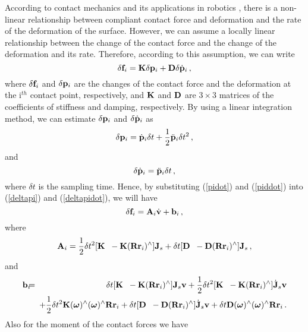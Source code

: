 \documentclass[a4paper, 11pt]{article}
\begin{document}
According to contact mechanics \cite{Johnson77} and its applications in
robotics \cite{Azad&Featherstone10, Azad&Featherstone14a, Hunt&Crossley75,
  Marhefka&Orin99}, there is a non-linear relationship between compliant
contact force and deformation and the rate of the deformation of the surface.
However, we can assume a locally linear relationship between the change of the
contact force and the change of the deformation and its rate.  Therefore,
according to this assumption, we can write
%
\begin{equation}
  \delta \mathbf{f}_i = \mathbf{K} \delta \mathbf{p}_i + \mathbf{D} \delta \dot{\mathbf{p}}_i \, ,
\end{equation}
%
where $\delta \mathbf{f}_i$ and $\delta \mathbf{p}_i$ are the changes of the contact force
and the deformation at the i$^{th}$ contact point, respectively, and $\mathbf{K}$ and
$\mathbf{D}$ are $3 \times 3$ matrices of the coefficients of stiffness and damping,
respectively.  By using a linear integration method, we can estimate $\delta
\mathbf{p}_i$ and $\delta \dot{\mathbf{p}}_i$ as
%
\begin{equation}
  \delta \mathbf{p}_i = \dot{\mathbf{p}}_i \delta t + \frac{1}{2} \ddot{\mathbf{p}}_i \delta t^2 \,
  ,
  \label{deltapi}
\end{equation}
%
and
%
\begin{equation}
  \delta \dot{\mathbf{p}}_i = \ddot{\mathbf{p}}_i \delta t \, ,
  \label{deltapidot}
\end{equation}
%
where $\delta t$ is the sampling time.  Hence, by substituting (\ref{pidot})
and (\ref{piddot}) into (\ref{deltapi}) and (\ref{deltapidot}), we will have
%
\begin{equation}
  \delta \mathbf{f}_i = \mathbf{A}_i \dot{\mathbf{v}} + \mathbf{b}_i \, ,
\end{equation}
%
where
%
%
\begin{equation}
  \mathbf{A}_i = \frac{1}{2} \delta t^2 [\mathbf{K} \; \; -\mathbf{K}(\mathbf{R} \mathbf{r}_i)^{\wedge}] \mathbf{J}_s +
  \delta t [\mathbf{D} \; \; - \mathbf{D}(\mathbf{R} \mathbf{r}_i)^{\wedge}] \mathbf{J}_s \, ,
\end{equation}
%
and
%
\begin{eqnarray}
  \nonumber \mathbf{b}_i & \!\!\!=\!\!\! & \delta t [\mathbf{K} \; \; -\mathbf{K}(\mathbf{R} \mathbf{r}_i)^{\wedge}] \mathbf{J}_s
  \mathbf{v} + \frac{1}{2} \delta t^2 [\mathbf{K} \; \; -\mathbf{K}(\mathbf{R} \mathbf{r}_i)^{\wedge}]
  \dot{\mathbf{J}}_s \mathbf{v}\\ & & + \frac{1}{2} \delta t^2 \mathbf{K} (\boldsymbol{\omega})^{\wedge}
  (\boldsymbol{\omega})^{\wedge} \mathbf{R} \mathbf{r}_i + \delta t [\mathbf{D} \; \; -\mathbf{D}(\mathbf{R} \mathbf{r}_i)^{\wedge}]
  \dot{\mathbf{J}}_s \mathbf{v} + \delta t \mathbf{D} (\boldsymbol{\omega})^{\wedge} (\boldsymbol{\omega})^{\wedge} \mathbf{R}
  \mathbf{r}_i \, .
\end{eqnarray}
%
Also for the moment of the contact forces we have
\end{document}
